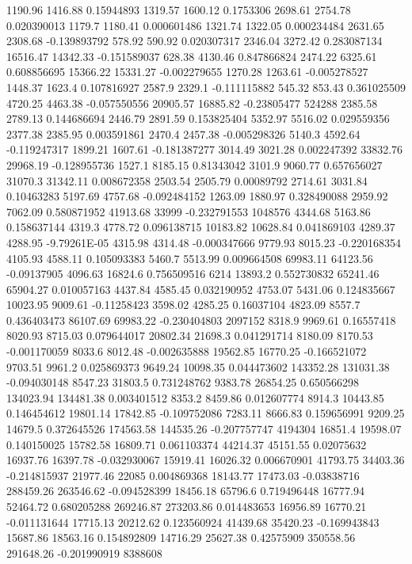 1190.96	1416.88	0.15944893	1319.57	1600.12	0.1753306	2698.61	2754.78	0.020390013	1179.7	1180.41	0.000601486	1321.74	1322.05	0.000234484	2631.65	2308.68	-0.139893792	578.92	590.92	0.020307317	2346.04	3272.42	0.283087134	16516.47	14342.33	-0.151589037	628.38	4130.46	0.847866824	2474.22	6325.61	0.608856695	15366.22	15331.27	-0.002279655	1270.28	1263.61	-0.005278527	1448.37	1623.4	0.107816927	2587.9	2329.1	-0.111115882	545.32	853.43	0.361025509	4720.25	4463.38	-0.057550556	20905.57	16885.82	-0.23805477	524288
2385.58	2789.13	0.144686694	2446.79	2891.59	0.153825404	5352.97	5516.02	0.029559356	2377.38	2385.95	0.003591861	2470.4	2457.38	-0.005298326	5140.3	4592.64	-0.119247317	1899.21	1607.61	-0.181387277	3014.49	3021.28	0.002247392	33832.76	29968.19	-0.128955736	1527.1	8185.15	0.81343042	3101.9	9060.77	0.657656027	31070.3	31342.11	0.008672358	2503.54	2505.79	0.00089792	2714.61	3031.84	0.10463283	5197.69	4757.68	-0.092484152	1263.09	1880.97	0.328490088	2959.92	7062.09	0.580871952	41913.68	33999	-0.232791553	1048576
4344.68	5163.86	0.158637144	4319.3	4778.72	0.096138715	10183.82	10628.84	0.041869103	4289.37	4288.95	-9.79261E-05	4315.98	4314.48	-0.000347666	9779.93	8015.23	-0.220168354	4105.93	4588.11	0.105093383	5460.7	5513.99	0.009664508	69983.11	64123.56	-0.09137905	4096.63	16824.6	0.756509516	6214	13893.2	0.552730832	65241.46	65904.27	0.010057163	4437.84	4585.45	0.032190952	4753.07	5431.06	0.124835667	10023.95	9009.61	-0.11258423	3598.02	4285.25	0.16037104	4823.09	8557.7	0.436403473	86107.69	69983.22	-0.230404803	2097152
8318.9	9969.61	0.16557418	8020.93	8715.03	0.079644017	20802.34	21698.3	0.041291714	8180.09	8170.53	-0.001170059	8033.6	8012.48	-0.002635888	19562.85	16770.25	-0.166521072	9703.51	9961.2	0.025869373	9649.24	10098.35	0.044473602	143352.28	131031.38	-0.094030148	8547.23	31803.5	0.731248762	9383.78	26854.25	0.650566298	134023.94	134481.38	0.003401512	8353.2	8459.86	0.012607774	8914.3	10443.85	0.146454612	19801.14	17842.85	-0.109752086	7283.11	8666.83	0.159656991	9209.25	14679.5	0.372645526	174563.58	144535.26	-0.207757747	4194304
16851.4	19598.07	0.140150025	15782.58	16809.71	0.061103374	44214.37	45151.55	0.02075632	16937.76	16397.78	-0.032930067	15919.41	16026.32	0.006670901	41793.75	34403.36	-0.214815937	21977.46	22085	0.004869368	18143.77	17473.03	-0.03838716	288459.26	263546.62	-0.094528399	18456.18	65796.6	0.719496448	16777.94	52464.72	0.680205288	269246.87	273203.86	0.014483653	16956.89	16770.21	-0.011131644	17715.13	20212.62	0.123560924	41439.68	35420.23	-0.169943843	15687.86	18563.16	0.154892809	14716.29	25627.38	0.42575909	350558.56	291648.26	-0.201990919	8388608
